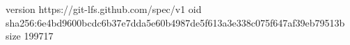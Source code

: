 version https://git-lfs.github.com/spec/v1
oid sha256:6e4bd9600bcdc6b37e7dda5e60b4987de5f613a3e338c075f647af39eb79513b
size 199717
